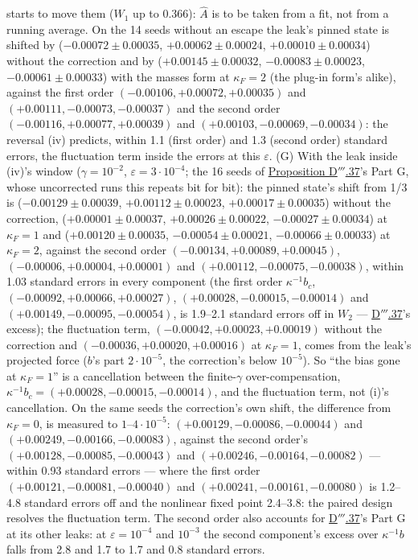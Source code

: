\begin{sloppypar}
starts to move them ($W_1$ up to 0.366): $\hat A$ is to be taken from a fit, not from a running average. On the 14
seeds without an escape the leak's pinned state is shifted by ($-0.00072\pm0.00035$, $+0.00062\pm0.00024$,
$+0.00010\pm0.00034$) without the correction and by ($+0.00145\pm0.00032$, $-0.00083\pm0.00023$, $-0.00061\pm0.00033$)
with the masses form at $\kappa_F = 2$ (the plug-in form's alike), against the first order
$(-0.00106, +0.00072, +0.00035)$ and $(+0.00111, -0.00073, -0.00037)$ and the second order
$(-0.00116, +0.00077, +0.00039)$ and $(+0.00103, -0.00069, -0.00034)$: the reversal (iv) predicts, within 1.1 (first
order) and 1.3 (second order) standard errors, the fluctuation term inside the errors at this $\varepsilon$. (G) With
the leak inside (iv)'s window ($\gamma = 10^{-2}$, $\varepsilon = 3\cdot10^{-4}$; the 16 seeds of
\hyperref[res:thmDppp:37]{Proposition D$'''$.37}'s Part G, whose uncorrected runs this repeats bit for bit): the
pinned state's shift from 1/3 is ($-0.00129\pm0.00039$, $+0.00112\pm0.00023$, $+0.00017\pm0.00035$) without the
correction, ($+0.00001\pm0.00037$, $+0.00026\pm0.00022$, $-0.00027\pm0.00034$) at $\kappa_F = 1$ and
($+0.00120\pm0.00035$, $-0.00054\pm0.00021$, $-0.00066\pm0.00033$) at $\kappa_F = 2$, against the second order
$(-0.00134, +0.00089, +0.00045)$, $(-0.00006, +0.00004, +0.00001)$ and $(+0.00112, -0.00075, -0.00038)$, within 1.03
standard errors in every component (the first order $\kappa^{-1}b_c$, $(-0.00092, +0.00066, +0.00027)$,
$(+0.00028, -0.00015, -0.00014)$ and $(+0.00149, -0.00095, -0.00054)$, is 1.9--2.1 standard errors off in $W_2$ ---
\hyperref[res:thmDppp:37]{D$'''$.37}'s excess); the fluctuation term, $(-0.00042, +0.00023, +0.00019)$ without the
correction and $(-0.00036, +0.00020, +0.00016)$ at $\kappa_F = 1$, comes from the leak's projected force ($b$'s part
$2\cdot10^{-5}$, the correction's below $10^{-5}$). So ``the bias gone at $\kappa_F = 1$'' is a cancellation between the
finite-$\gamma$ over-compensation, $\kappa^{-1}b_c = (+0.00028, -0.00015, -0.00014)$, and the fluctuation term, not
(i)'s cancellation. On the same seeds the correction's own shift, the difference from $\kappa_F = 0$, is measured to
$1$--$4\cdot10^{-5}$: $(+0.00129, -0.00086, -0.00044)$ and $(+0.00249, -0.00166, -0.00083)$, against the second
order's $(+0.00128, -0.00085, -0.00043)$ and $(+0.00246, -0.00164, -0.00082)$ --- within 0.93 standard errors ---
where the first order $(+0.00121, -0.00081, -0.00040)$ and $(+0.00241, -0.00161, -0.00080)$ is 1.2--4.8 standard
errors off and the nonlinear fixed point 2.4--3.8: the paired design resolves the fluctuation term. The second order
also accounts for \hyperref[res:thmDppp:37]{D$'''$.37}'s Part G at its other leaks: at $\varepsilon = 10^{-4}$ and
$10^{-3}$ the second component's excess over $\kappa^{-1}b$ falls from 2.8 and 1.7 to 1.7 and 0.8 standard errors.
\end{sloppypar}

